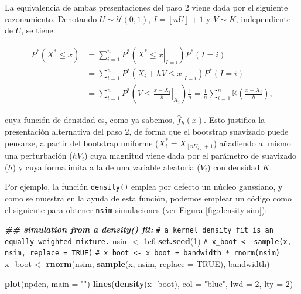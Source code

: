 \documentclass[
]{book}
\newenvironment{Shaded}{\begin{snugshade}}{\end{snugshade}}
\newcommand{\AttributeTok}[1]{\textcolor[rgb]{0.13,0.29,0.53}{#1}}
\newcommand{\CommentTok}[1]{\textcolor[rgb]{0.56,0.35,0.01}{\textit{#1}}}
\newcommand{\ConstantTok}[1]{\textcolor[rgb]{0.56,0.35,0.01}{#1}}
\newcommand{\DecValTok}[1]{\textcolor[rgb]{0.00,0.00,0.81}{#1}}
\newcommand{\DocumentationTok}[1]{\textcolor[rgb]{0.56,0.35,0.01}{\textbf{\textit{#1}}}}
\newcommand{\FloatTok}[1]{\textcolor[rgb]{0.00,0.00,0.81}{#1}}
\newcommand{\FunctionTok}[1]{\textcolor[rgb]{0.13,0.29,0.53}{\textbf{#1}}}
\newcommand{\NormalTok}[1]{#1}
\newcommand{\OtherTok}[1]{\textcolor[rgb]{0.56,0.35,0.01}{#1}}
\newcommand{\StringTok}[1]{\textcolor[rgb]{0.31,0.60,0.02}{#1}}
\theoremstyle{break}
\theoremstyle{nonumberplain}
\renewcommand{\CommentTok}[1]{\textcolor[rgb]{0.41,0.41,0.41}{\texttt{#1}}}
\begin{document}
La equivalencia de ambas presentaciones del paso 2 viene dada por el
siguiente razonamiento. Denotando \(U\sim \mathcal{U}\left( 0,1 \right)\),
\(I=\left\lfloor nU\right\rfloor +1\) y \(V\sim K\), independiente de \(U\), se
tiene:

\[\begin{aligned}
P^{\ast}\left( X^{\ast}\leq x \right) &= \sum_{i=1}^{n}P^{\ast}\left(
\left. X^{\ast}\leq x\right\vert _{I=i} \right) P^{\ast}\left( I=i \right) \\
&= \sum_{i=1}^{n}P^{\ast}\left( \left. X_i+hV\leq x\right\vert
_{I=i} \right) P^{\ast}\left( I=i \right) \\
&= \sum_{i=1}^{n}P^{\ast}\left( \left. V\leq \frac{x-X_i}{h}
\right\vert _{X_i} \right) \frac{1}{n}=\frac{1}{n}\sum_{i=1}^{n}\mathbb{K}
\left( \frac{x-X_i}{h} \right),
\end{aligned}\]

cuya función de densidad es, como ya sabemos, \(\hat{f}_{h}\left(
x \right)\). Esto justifica la presentación alternativa del paso 2, de
forma que el bootstrap suavizado puede pensarse, a partir del bootstrap
uniforme (\(X_i^{\ast}=X_{\left\lfloor nU_i\right\rfloor +1}\))
añadiendo al mismo una perturbación (\(hV_i\)) cuya magnitud viene dada
por el parámetro de suavizado (\(h\)) y cuya forma imita a la de una
variable aleatoria (\(V_i\)) con densidad \(K\).

Por ejemplo, la función \texttt{density()} emplea por defecto un núcleo
gaussiano, y como se muestra en la ayuda de esta función,
podemos emplear un código como el siguiente para obtener
\texttt{nsim} simulaciones (ver Figura \ref{fig:density-sim}):

\begin{Shaded}
\begin{Highlighting}[]
\DocumentationTok{\#\# simulation from a density() fit:}
\CommentTok{\# a kernel density fit is an equally{-}weighted mixture.}
\NormalTok{nsim }\OtherTok{\textless{}{-}} \FloatTok{1e6}
\FunctionTok{set.seed}\NormalTok{(}\DecValTok{1}\NormalTok{)}
\CommentTok{\# x\_boot \textless{}{-} sample(x, nsim, replace = TRUE)}
\CommentTok{\# x\_boot \textless{}{-} x\_boot + bandwidth * rnorm(nsim)}
\NormalTok{x\_boot }\OtherTok{\textless{}{-}} \FunctionTok{rnorm}\NormalTok{(nsim, }\FunctionTok{sample}\NormalTok{(x, nsim, }\AttributeTok{replace =} \ConstantTok{TRUE}\NormalTok{), bandwidth)}

\FunctionTok{plot}\NormalTok{(npden, }\AttributeTok{main =} \StringTok{""}\NormalTok{)}
\FunctionTok{lines}\NormalTok{(}\FunctionTok{density}\NormalTok{(x\_boot), }\AttributeTok{col =} \StringTok{"blue"}\NormalTok{, }\AttributeTok{lwd =} \DecValTok{2}\NormalTok{, }\AttributeTok{lty =} \DecValTok{2}\NormalTok{)}
\end{Highlighting}
\end{Shaded}
\end{document}
